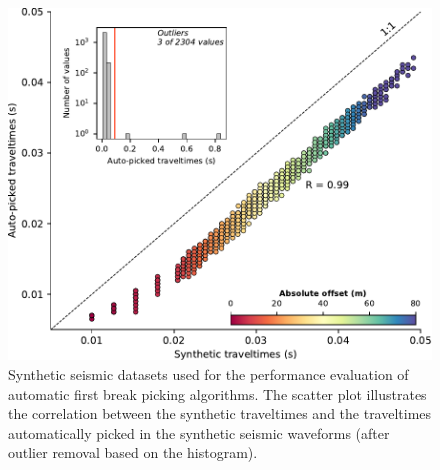 \documentclass[a4paper,fleqn]{cas-sc}
\begin{document}
\begin{figure}
	\centering
	\includegraphics[width=.75\textwidth]{./figures/pick_comparison.pdf}
	\caption{Synthetic seismic datasets used for the performance evaluation of automatic first break picking algorithms. The scatter plot illustrates the correlation between the synthetic traveltimes and the traveltimes automatically picked in the synthetic seismic waveforms (after outlier removal based on the histogram).}
	\label{fig:pick_comparison}
\end{figure}
\end{document}
